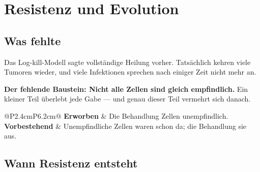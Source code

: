 \chapter{Resistenz und Evolution}

\section{Was fehlte}

\begin{merksatz}
Das Log-kill-Modell sagte vollständige Heilung vorher. Tatsächlich kehren viele Tumoren wieder, und viele Infektionen sprechen nach einiger Zeit nicht mehr an.

\begin{center}
\begin{minipage}{0.9\textwidth}
\textbf{Der fehlende Baustein: Nicht alle Zellen sind gleich empfindlich.} Ein kleiner Teil überlebt jede Gabe --- und genau dieser Teil vermehrt sich danach.
\end{minipage}
\end{center}

\begin{center}
\renewcommand{\arraystretch}{1.5}
\begin{tabular}{@{}P{2.4cm}P{6.2cm}@{}}
\toprule
\textbf{Erworben} & Die Behandlung  Zellen unempfindlich.\\
\textbf{Vorbestehend} & Unempfindliche Zellen waren schon da; die Behandlung  sie aus.\\
\bottomrule
\end{tabular}
\end{center}

\begin{center}
\begin{minipage}{0.88\textwidth}
\end{minipage}
\end{center}
\end{merksatz}

\section{Wann Resistenz entsteht}

